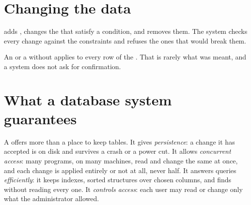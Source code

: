 \section{Changing the data}\label{sec:g12:relational-databases-sql:changes}

 adds ,  changes the  that satisfy a condition, and
 removes them. The  system checks every change against the constraints and refuses
the ones that would break them.

\label{out:g12:relational-databases-sql:changes}

An  or a  without  applies to every row of the . That is rarely what was
meant, and a  system does not ask for confirmation.

\section{What a database system guarantees}\label{sec:g12:relational-databases-sql:dbms}

A  offers more than a place to keep tables. It gives \emph{persistence}: a change it has
accepted is on disk and survives a crash or a power cut. It allows \emph{concurrent access}: many programs, on many
machines, read and change the same  at once, and each change is applied entirely or not at all, never half.
It answers queries \emph{efficiently}: it keeps indexes, sorted structures over chosen columns, and finds  without
reading every one. It \emph{controls access}: each user may read or change only what the administrator allowed.

